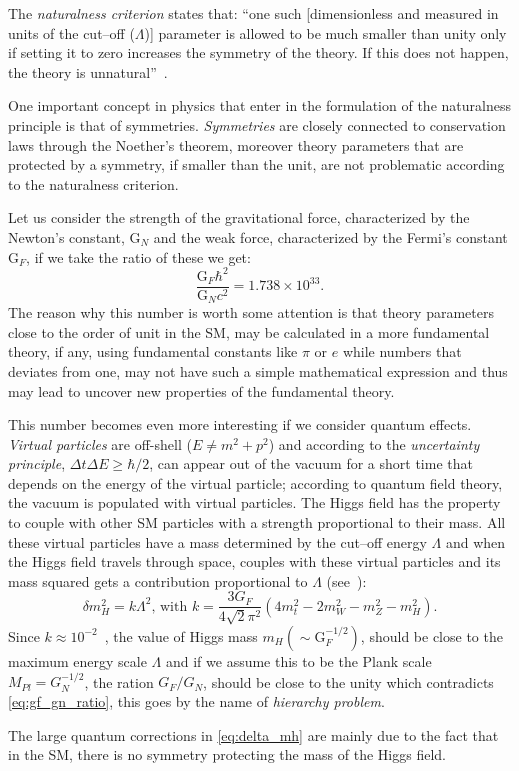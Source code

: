 The \emph{naturalness criterion} states that: ``one such [dimensionless and
measured in units of the cut--off ($\Lambda$)] parameter is allowed to be much
smaller than unity only if setting it to zero increases the symmetry of the
theory. If this does not happen, the theory is unnatural''~\cite{thooft:gauge}.

One important concept in physics that enter in the formulation of the
naturalness principle is that of symmetries. \emph{Symmetries} are closely
connected to conservation laws through the Noether's theorem, moreover theory
parameters that are protected by a symmetry, if smaller than the unit, are not
problematic according to the naturalness criterion.

Let us consider the strength of the gravitational force, characterized by the
Newton's constant, G$_N$ and the weak force, characterized by the Fermi's
constant G$_F$, if we take the ratio of these we get:
\begin{equation}
  \label{eq:gf_gn_ratio}
  \frac{\mathrm{G}_F \hbar^2}{\mathrm{G}_N c^2} = 1.738 \times 10^{33}.
\end{equation}
The reason why this number is worth some attention is that theory parameters
close to the order of unit in the SM, may be calculated in a more fundamental
theory, if any, using fundamental constants like $\pi$ or $e$ while numbers that
deviates from one, may not have such a simple mathematical expression and thus
may lead to uncover new properties of the fundamental theory.

This number becomes even more interesting if we consider quantum effects.
\emph{Virtual particles} are off-shell ($E \neq m^2 + p^2$) and according to the
\emph{uncertainty principle}, $\Delta t \Delta E \geq \hbar / 2$, can appear out
of the vacuum for a short time that depends on the energy of the virtual
particle; according to quantum field theory, the vacuum is populated with
virtual particles. The Higgs field has the property to couple with other SM
particles with a strength proportional to their mass. All these virtual
particles have a mass determined by the cut--off energy $\Lambda$ and when the
Higgs field travels through space, couples with these virtual particles and its
mass squared gets a contribution proportional to $\Lambda$
(see~\cite{Giudice:2008bi}):
\begin{equation}
  \label{eq:delta_mh}
  \delta m_H^2 = k \Lambda^2 \text{, with } k = \frac{3 G_F}{4 \sqrt{2}
    \pi^2}(4m_t^2 - 2m_W^2 - m_Z^2 - m_H^2).
\end{equation}
Since $k \approx 10^{-2}$~\cite{Giudice:2008bi}, the value of Higgs mass
$m_H (\sim \mathrm{G}_F^{-1/2})$, should be close to the maximum energy scale
$\Lambda$ and if we assume this to be the Plank scale $M_{Pl} = G_N^{-1/2}$, the
ration $G_F/G_N$, should be close to the unity which contradicts
\cref{eq:gf_gn_ratio}, this goes by the name of \emph{hierarchy problem}.

The large quantum corrections in \cref{eq:delta_mh} are mainly due to the fact
that in the SM, there is no symmetry protecting the mass of the Higgs field.
